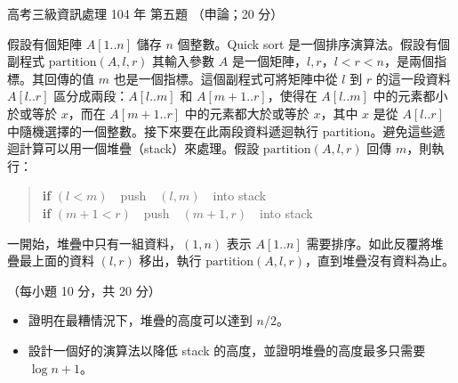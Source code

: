 \begin{pastexam}[label={px:gk3-104-ds-05}]{高考三級資訊處理 104 年 第五題}
（申論；20 分）

假設有個矩陣 $A[1..n]$ 儲存 $n$ 個整數。Quick sort 是一個排序演算法。假設有個副程式 $\mathrm{partition}(A,l,r)$ 其輸入參數 $A$ 是一個矩陣，$l,r$，$l<r<n$，是兩個指標。其回傳的值 $m$ 也是一個指標。這個副程式可將矩陣中從 $l$ 到 $r$ 的這一段資料 $A[l..r]$ 區分成兩段：$A[l..m]$ 和 $A[m+1..r]$，使得在 $A[l..m]$ 中的元素都小於或等於 $x$，而在 $A[m+1..r]$ 中的元素都大於或等於 $x$，其中 $x$ 是從 $A[l..r]$ 中隨機選擇的一個整數。接下來要在此兩段資料遞迴執行 partition。避免這些遞迴計算可以用一個堆疊（stack）來處理。假設 $\mathrm{partition}(A,l,r)$ 回傳 $m$，則執行：
\begin{quote}
\textbf{if} $(l<m)$\ \ push\ \ $(l,m)$\ \ into stack\\
\textbf{if} $(m+1<r)$\ \ push\ \ $(m+1,r)$\ \ into stack
\end{quote}
一開始，堆疊中只有一組資料，$(1,n)$ 表示 $A[1..n]$ 需要排序。如此反覆將堆疊最上面的資料 $(l,r)$ 移出，執行 $\mathrm{partition}(A,l,r)$，直到堆疊沒有資料為止。

（每小題 10 分，共 20 分）
\begin{itemize}[leftmargin=2.2em]
\item[㈠] 證明在最糟情況下，堆疊的高度可以達到 $n/2$。
\item[㈡] 設計一個好的演算法以降低 stack 的高度，並證明堆疊的高度最多只需要 $\log n+1$。
\end{itemize}
\end{pastexam}

